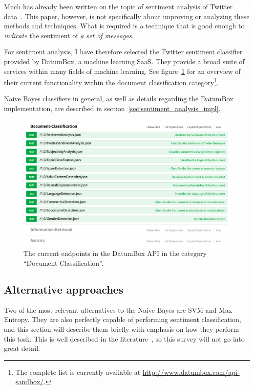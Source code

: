 Much has already been written on the topic of sentiment analysis of Twitter data~\cite{go2009twitter, go2009twitterdistant, pak2010twitter, agarwal2011sentiment, kouloumpis2011twitter}. This paper, however, is not specifically about improving or analyzing these methods and techniques. What is required is a technique that is good enough to \emph{indicate} the sentiment of \emph{a set of messages}.

For sentiment analysis, I have therefore selected the Twitter sentiment classifier provided by DatumBox, a machine learning SaaS. They provide a broad suite of services within many fields of machine learning. See figure~\ref{fig:datumbox_api} for an overview of their current functionality within the document classification category\footnote{The complete list is currently available at \url{http://www.datumbox.com/api-sandbox/}.}.

Naive Bayes classifiers in general, as well as details regarding the DatumBox implementation, are described in section~\ref{sec:sentiment_analysis_impl}.

\begin{figure}[h]
  \centering
    \includegraphics[width=\textwidth]{Figures/datumbox_api}
  \caption{The current endpoints in the DatumBox API in the category ``Document Classification''.}
  \label{fig:datumbox_api}
\end{figure}

\subsection{Alternative approaches}

Two of the most relevant alternatives to the Naive Bayes are SVM and Max Entropy. They are also perfectly capable of performing sentiment classification, and this section will describe them briefly with emphasis on how they perform this task. This is well described in the literature~\cite{pang2002thumbs}, so this survey will not go into great detail.

